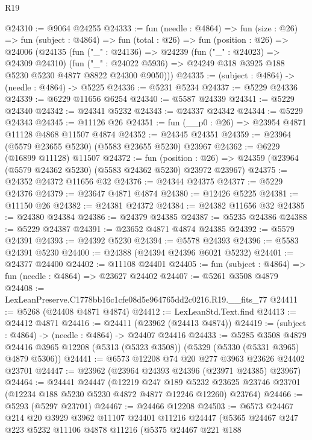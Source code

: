 \begin{lexlean}{R19}
\begin{coremodule}
@24310 := @9064 @24255
@24333 := fun (needle : @4864) =>
  fun (size : @26) =>
  fun (subject : @4864) =>
  fun (total : @26) =>
  fun (position : @26) =>
  @24006
    (@24135
      (fun ("_" : @24136) =>
      @24239
        (fun ("_" : @24023) => @24309 @24310)
        (fun ("_" : @24022 @5936) => @24249 @318 @3925 @188 @5230 @5230 @4877 @8822 @24300 @9050)))
@24335 := (subject : @4864) -> (needle : @4864) -> @5225
@24336 := @5231 @5234
@24337 := @5229 @24336
@24339 := @6229 @11656 @6254
@24340 := @5587 @24339
@24341 := @5229 @24340
@24342 := @24341 @5232
@24343 := @24337 @24342
@24344 := @5229 @24343
@24345 := @11126 @26
@24351 := fun (__p0 : @26) => @23954 @4871 @11128 @4868 @11507 @4874
@24352 := @24345 @24351
@24359 := @23964 (@5579 @23655 @5230) (@5583 @23655 @5230) @23967
@24362 := @6229 (@16899 @11128) @11507
@24372 := fun (position : @26) =>
  @24359 (@23964 (@5579 @24362 @5230) (@5583 @24362 @5230) @23972 @23967)
@24375 := @24352 @24372 @11656 @32
@24376 := @24344 @24375
@24377 := @5229 @24376
@24379 := @23647 @4871 @4874
@24380 := @12426 @5225
@24381 := @11150 @26
@24382 := @24381 @24372
@24384 := @24382 @11656 @32
@24385 := @24380 @24384
@24386 := @24379 @24385
@24387 := @5235 @24386
@24388 := @5229 @24387
@24391 := @23652 @4871 @4874 @24385
@24392 := @5579 @24391
@24393 := @24392 @5230
@24394 := @5578 @24393
@24396 := @5583 @24391 @5230
@24400 := @24388 (@24394 @24396 @6021 @5232)
@24401 := @24377 @24400
@24402 := @11108 @24401
@24405 := fun (subject : @4864) => fun (needle : @4864) => @23627 @24402
@24407 := @5261 @3508 @4879
@24408 := LexLeanPreserve.C1778bb16c1cfe08d5e964765dd2c0216.R19.__fits_77
@24411 := @5268 (@24408 @4871 @4874)
@24412 := LexLeanStd.Text.find
@24413 := @24412 @4871
@24416 := @24411 (@23962 (@24413 @4874))
@24419 := (subject : @4864) -> (needle : @4864) -> @24407 @24416
@24433 := @5285
    @3508
    @4879
    @24416
    @3965
    @12208
    (@5313 (@5323 @3508))
    (@5329 (@5330 (@5331 @3965) @4879 @5306))
@24441 := @6573 @12208 @74 @20 @277 @3963 @23626 @24402 @23701
@24447 := @23962 (@23964 @24393 @24396 (@23971 @24385) @23967)
@24464 := @24441
    @24447
    (@12219
      @247
      @189
      @5232
      @23625
      @23746
      @23701
      (@12234 @188 @5230 @5230 @4872 @4877 @12246 @12260)
      @23764)
@24466 := @5293 (@5297 @23701)
@24467 := @24466 @12208
@24503 := @6573
    @24467
    @214
    @20
    @3929
    @3962
    @11107
    @24401
    @11216
    @24447
    (@5365
      @24467
      @247
      @223
      @5232
      @11106
      @4878
      @11216
      (@5375
        @24467
        @221
        @188

\end{coremodule}
\end{lexlean}
